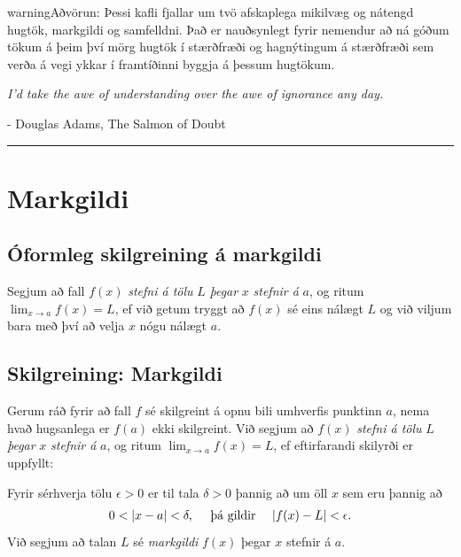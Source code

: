 \documentclass[b5paper,10pt,icelandic]{sphinxmanual}
\begin{document}
\begin{notice}{warning}{Aðvörun:}
Þessi kafli fjallar um tvö afskaplega mikilvæg og nátengd hugtök,
markgildi og samfelldni. Það er nauðsynlegt fyrir nemendur að ná
góðum tökum á þeim því mörg hugtök í stærðfræði og hagnýtingum á stærðfræði
sem verða á vegi ykkar í framtíðinni byggja á þessum hugtökum.
\end{notice}

\emph{I'd take the awe of understanding over the awe of ignorance any day.}

- Douglas Adams, The Salmon of Doubt


\bigskip\hrule{}\bigskip



\section{Markgildi}
\label{kafli02:id1}\label{kafli02:markgildi}

\subsection{Óformleg skilgreining á markgildi}
\label{kafli02:index-0}\label{kafli02:oformleg-skilgreining-a-markgildi}
Segjum að fall \(f(x)\) \emph{stefni á tölu} \(L\) \emph{þegar} \(x\)
\emph{stefnir á} \(a\), og ritum \(\lim_{x\rightarrow a} f(x)=L\), ef
við getum tryggt að \(f(x)\) sé eins nálægt \(L\) og við
viljum bara með því að velja \(x\) nógu nálægt \(a\).


\subsection{Skilgreining: Markgildi}
\label{kafli02:skilgreining-markgildi}
Gerum ráð fyrir að fall \(f\) sé skilgreint á opnu bili umhverfis
punktinn \(a\), nema hvað hugsanlega er \(f(a)\) ekki
skilgreint. Við segjum að \(f(x)\) \emph{stefni á tölu} \(L\) \emph{þegar}
\(x\) \emph{stefnir á} \(a\), og ritum
\(\lim_{x\rightarrow a} f(x)=L\), ef eftirfarandi skilyrði er
uppfyllt:

Fyrir sérhverja tölu \(\epsilon>0\) er til tala \(\delta>0\)
þannig að um öll \(x\) sem eru þannig að
\begin{gather}
\begin{split}0 < |x-a| < \delta,\quad \text{ þá gildir } \quad |f(x)-L| <\epsilon.\end{split}\notag
\end{gather}
Við segjum að talan \(L\) sé \textit{markgildi} \(f(x)\) þegar
\(x\) stefnir á \(a\).
\end{document}
